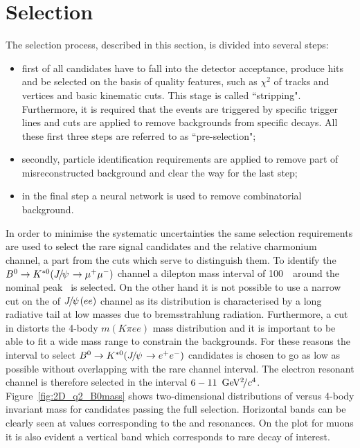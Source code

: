 \section{Selection}
\label{sec:RKst_selection}

The selection process, described in this section, is divided into several steps:
\begin{itemize}
\item first of all candidates have to fall into the detector acceptance, produce hits and be selected
on the basis of quality features, such as $\chi^2$ of tracks and vertices and basic kinematic cuts.
This stage is called ``stripping". Furthermore, it is required that the events are triggered by specific
trigger lines and cuts are applied to remove backgrounds from specific decays.
All these first three steps are referred to as ``pre-selection";
\item secondly, particle identification requirements are applied to remove part of misreconstructed
background and clear the way for the last step;
\item in the final step a neural network is used to remove combinatorial background.
\end{itemize}
%
In order to minimise the systematic uncertainties the same selection requirements are used to select 
the rare signal candidates and the relative charmonium channel, a part from the \qsq cuts which serve
to distinguish them. To identify the $\Bz \to\Kstarz(\jpsi\to \mumu)$ channel a dilepton mass
interval of 100~\mevcc~around the nominal \jpsi peak~\cite{PDG2014} is selected.
On the other hand it is not possible to use a narrow cut on the \qsq of $\jpsi(ee)$ channel as its
distribution is characterised by a long radiative tail at low masses due to bremsstrahlung radiation.
Furthermore, a cut in \qsq distorts the 4-body $m(K\pi ee)$ mass distribution and it is important to
be able to fit a wide mass range to constrain the backgrounds. For these reasons the interval to select
$\Bz \to\Kstarz(\jpsi\to \epem)$ candidates is chosen to go as low as possible without overlapping with
the rare channel interval. The electron resonant channel is therefore selected in the interval
$6-11~{\mathrm{\,Ge\kern -0.1em V^2\!/}c^4}$. Figure~\ref{fig:2D_q2_B0mass} shows two-dimensional distributions
of \qsq versus 4-body invariant mass for candidates passing the full selection.
Horizontal bands can be clearly seen at \qsq values corresponding to the \jpsi and \psitwos resonances.
On the plot for muons it is also evident a vertical band which corresponds to rare decay of interest.

